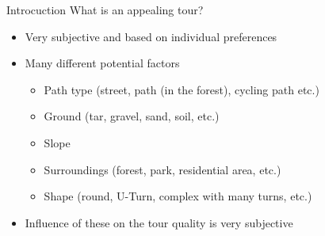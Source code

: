\documentclass[aspectratio=169,xcolor=dvipsnames, t]{beamer}
\begin{document}
	\begin{frame}{Introcuction}
		\vspace{0.25cm}
		What is an appealing tour?\\
		\pause
		\vspace{-0.2cm}
		\begin{minipage}[t]{0.48\textwidth}
			\begin{itemize}[<+->]
				\item Very subjective and based on individual preferences
				\item Many different potential factors
				\begin{itemize}[<+->]
					\item Path type (street, path (in the forest), cycling path etc.)
					\item Ground (tar, gravel, sand, soil, etc.)
					\item Slope
					\item Surroundings (forest, park, residential area, etc.)
					\item Shape (round, U-Turn, complex with many turns, etc.)
				\end{itemize}
				\item Influence of these on the tour quality is very subjective 
		\end{itemize}
		\end{minipage}
		\begin{minipage}[t][0.7\textheight][b]{0.48\textwidth}
\end{minipage}
\end{frame}
\end{document}
